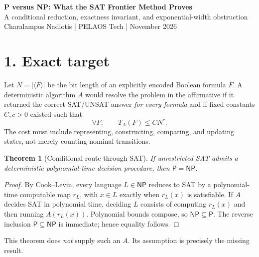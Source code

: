 \documentclass[11pt,a4paper]{article}
\newtheorem{theorem}{Theorem}
\newcommand{\NP}{\mathsf{NP}}
\newcommand{\PP}{\mathsf{P}}
\begin{document}
\begin{center}
{\LARGE\bfseries P versus NP: What the SAT Frontier Method Proves}\\[2mm]
{\large A conditional reduction, exactness invariant, and exponential-width obstruction}\\[2mm]
Charalampos Nadiotis \quad | \quad PELAOS Tech \quad |  November 2026
\end{center}
\vspace{-3mm}
\begin{center}
\end{center}
\vspace{-3mm}

\section*{1. Exact target}
Let $N=|\langle F\rangle|$ be the bit length of an explicitly encoded Boolean formula $F$. A deterministic algorithm $A$ would resolve the problem in the affirmative if it returned the correct SAT/UNSAT answer \emph{for every formula} and if fixed constants $C,c>0$ existed such that
\[
\boxed{\forall F:\qquad T_A(F)\le C N^c.}
\]
The cost must include representing, constructing, comparing, and updating states, not merely counting nominal transitions.

\begin{theorem}[Conditional route through SAT]
If unrestricted SAT admits a deterministic polynomial-time decision procedure, then $\PP=\NP$.
\end{theorem}
\begin{proof}
By Cook--Levin, every language $L\in\NP$ reduces to SAT by a polynomial-time computable map $r_L$, with $x\in L$ exactly when $r_L(x)$ is satisfiable. If $A$ decides SAT in polynomial time, deciding $L$ consists of computing $r_L(x)$ and then running $A(r_L(x))$. Polynomial bounds compose, so $\NP\subseteq\PP$. The reverse inclusion $\PP\subseteq\NP$ is immediate; hence equality follows.
\end{proof}
This theorem does \emph{not} supply such an $A$. Its assumption is precisely the missing result.
\end{document}
